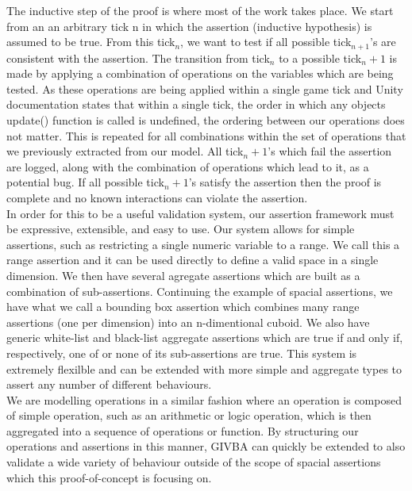 \documentclass[letterpaper,twocolumn,10pt]{article}
\begin{document}
The inductive step of the proof is where most of the work takes place. We start from an an arbitrary tick n in which the assertion (inductive hypothesis) is assumed to be true. From this tick$_n$, we want to test if all possible tick$_{n+1}$'s are consistent with the assertion. The transition from tick$_n$ to a possible tick$_n+1$ is made by applying a combination of operations on the variables which are being tested. As these operations are being applied within a single game tick and Unity documentation states that within a single tick, the order in which any objects update() function is called is undefined, the ordering between our operations does not matter. This is repeated for all combinations within the set of operations that we previously extracted from our model. All tick$_n+1$'s which fail the assertion are logged, along with the combination of operations which lead to it, as a potential bug. If all possible tick$_n+1$'s satisfy the assertion then the proof is complete and no known interactions can violate the assertion. \\

In order for this to be a useful validation system, our assertion framework must be expressive, extensible, and easy to use. Our system allows for simple assertions, such as restricting a single numeric variable to a range. We call this a range assertion and it can be used directly to define a valid space in a single dimension. We then have several agregate assertions which are built as a combination of sub-assertions. Continuing the example of spacial assertions, we have what we call a bounding box assertion which combines many range assertions (one per dimension) into an n-dimentional cuboid. We also have generic white-list and black-list aggregate assertions which are true if and only if, respectively, one of or none of its sub-assertions are true. This system is extremely flexilble and can be extended with more simple and aggregate types to assert any number of different behaviours. \\

We are modelling operations in a similar fashion where an operation is composed of simple operation, such as an arithmetic or logic operation, which is then aggregated into a sequence of operations or function. By structuring our operations and assertions in this manner, GIVBA can quickly be extended to also validate a wide variety of behaviour outside of the scope of spacial assertions which this proof-of-concept is focusing on. \\
\end{document}
